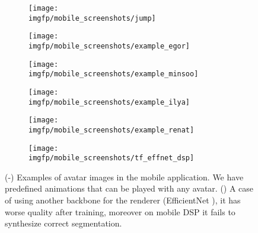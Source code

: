 \begin{figure}[hb]
	\centering
	\begin{subfigure}[b]{0.3\textwidth}
		\centering
		\texttt{[image: \\imgfp/mobile\_screenshots/jump]}%
		\caption{}
		\label{fig:mobile_example_jump}
	\end{subfigure}
	\hfill
	\begin{subfigure}[b]{0.3\textwidth}
		\centering
		\texttt{[image: \\imgfp/mobile\_screenshots/example\_egor]}
		\caption{}
	\end{subfigure}
	\hfill
	\begin{subfigure}[b]{0.3\textwidth}
		\centering
		\texttt{[image: \\imgfp/mobile\_screenshots/example\_minsoo]}
		\caption{}
	\end{subfigure}
	\vspace{1em}
		\begin{subfigure}[b]{0.3\textwidth}
		\centering
		\texttt{[image: \\imgfp/mobile\_screenshots/example\_ilya]}%
		\caption{}
	\end{subfigure}
	\hfill
	\begin{subfigure}[b]{0.3\textwidth}
		\centering
		\texttt{[image: \\imgfp/mobile\_screenshots/example\_renat]}
		\caption{}
		\label{fig:mobile_example_renat}
	\end{subfigure}
	\hfill
	\begin{subfigure}[b]{0.3\textwidth}
		\centering
		\texttt{[image: \\imgfp/mobile\_screenshots/tf\_effnet\_dsp]}
		\caption{}
		\label{fig:mobile_tf_effent_fail}
	\end{subfigure}
	\caption{(\protect{}-\protect{}) Examples of avatar images in the mobile application. We have predefined animations that can be played with any avatar. (\protect{}) A case of using another backbone for the renderer (EfficientNet \cite{dnn:efficientnetv1-19}), it has worse quality after training, moreover on mobile DSP it fails to synthesize correct segmentation. }
	\label{fig:mobile_example}
\end{figure}
